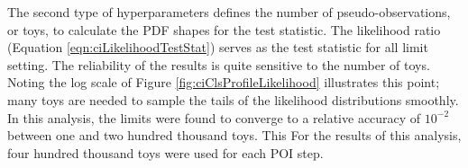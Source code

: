 The second type of hyperparameters defines the number of pseudo-observations, or toys, to calculate the PDF shapes for the test statistic.
The likelihood ratio (Equation \ref{eqn:ciLikelihoodTestStat}) serves as the test statistic for all limit setting.
The reliability of the results is quite sensitive to the number of toys.
Noting the log scale of Figure \ref{fig:ciClsProfileLikelihood} illustrates this point; many toys are needed to sample the tails of the likelihood distributions smoothly.
In this analysis, the limits were found to converge to a relative accuracy of $10^{-2}$ between one and two hundred thousand toys.
This 
For the results of this analysis, four hundred thousand toys were used for each POI step.
